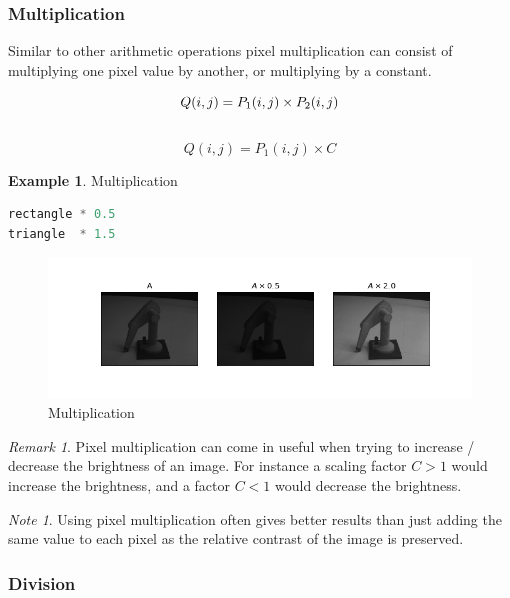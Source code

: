 \documentclass{article}
\theoremstyle{definition}
\newtheorem{ex}{Example}[subsection]
\theoremstyle{remark}
\newtheorem*{rem}{Remark}
\newtheorem*{nb}{Note}
\begin{document}
\subsubsection{Multiplication}

Similar to other arithmetic operations pixel multiplication can consist of multiplying one pixel value by another, or multiplying by a constant.


\begin{equation}
    Q(i, j) = P_1(i, j) \times P_2(i, j)\\
\end{equation}\\

\begin{equation*}
    Q(i, j) = P_1(i, j) \times C
\end{equation*}

\begin{ex} Multiplication
\begin{lstlisting}[language=Python]
rectangle * 0.5
triangle  * 1.5
\end{lstlisting}
\begin{figure}[h!]
    \centering
    \includegraphics[width=\textwidth]{ocv_multiplication}
    \caption{Multiplication}
    \label{fig:ocv_mult}
\end{figure}
\end{ex}


\begin{rem}
Pixel multiplication can come in useful when trying to increase / decrease the brightness of an image. For instance a scaling factor $ C > 1 $ would increase the brightness, and a factor $ C < 1 $ would decrease the brightness.
\end{rem}

\begin{nb}
Using pixel multiplication often gives better results than just adding the same value to each pixel as the relative contrast of the image is preserved.
\end{nb}

\subsubsection{Division}
\end{document}
